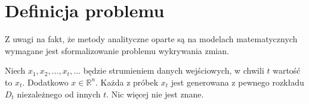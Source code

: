 \section{Definicja problemu}
Z uwagi na fakt,
że metody analityczne oparte są na modelach matematycznych
wymagane jest sformalizowanie problemu wykrywania zmian.

Niech $x_1,x_2,\ldots,x_t,\ldots$ będzie strumieniem danych wejściowych,
w chwili $t$ wartość to $x_t$.
Dodatkowo $x \in \mathbb{R}^n$.
Każda z próbek $x_t$ jest generowana z pewnego rozkładu $D_t$ niezależnego od innych $t$.
Nic więcej nie jest znane.
